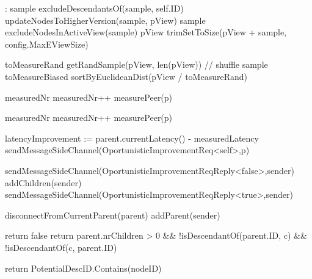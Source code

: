 \begin{algorithm}
\begin{algorithmic}[1]
    : \label{alg:memb:passive_view_maint:walk_reply_recv_start}
        \State sample \asdassign excludeDescendantsOf(sample, self.ID)
        \State updateNodesToHigherVersion(sample, pView)
        \State sample \asdassign excludeNodesInActiveView(sample)
        \State pView \asdassign trimSetToSize(pView + sample, config.MaxEViewSize) \label{alg:memb:passive_view_maint:walk_reply_recv_end}
    \asdend

     \label{alg:memb:passive_view_maint:eval_nodes}
        \State toMeasureRand \asdassign getRandSample(pView, len(pView)) // shuffle sample
        \State toMeasureBiased \asdassign sortByEuclideanDist(pView / toMeasureRand)

        \State measuredNr 
             \label{alg:memb:passive_view_maint:opt_verification_1}
                \State measuredNr++
                \State measurePeer(p)
            \EndIf
        \EndFor

        \State measuredNr 
             \label{alg:memb:passive_view_maint:opt_verification_2}
                \State measuredNr++
                \State measurePeer(p)
            \EndIf
        \EndFor
    \asdend

     \label{alg:memb:passive_view_maint:peer_measured}
        \State latencyImprovement := parent.currentLatency() - measuredLatency
            \State sendMessageSideChannel(OportunisticImprovementReq<self>,p)
        \EndIf
    \asdend

     \label{alg:memb:passive_view_maint:oport_msg_recv}
            \State sendMessageSideChannel(OportunisticImprovementReqReply<false>,sender)
        \Else
            \State addChildren(sender)
            \State sendMessageSideChannel(OportunisticImprovementReqReply<true>,sender)
        \EndIf
    \asdend

     \label{alg:memb:passive_view_maint:op_msg_reply_recv}
            \State disconnectFromCurrentParent(parent)
            \State addParent(sender)
        \EndIf
    \asdend

            \State return false
        \EndIf
        \State return parent.nrChildren > 0 \&\& !isDescendantOf(parent.ID, c) \&\& !isDescendantOf(c, parent.ID)
    \asdend

        \State return PotentialDescID.Contains(nodeID)
    \asdend

\end{algorithmic}
\end{algorithm}